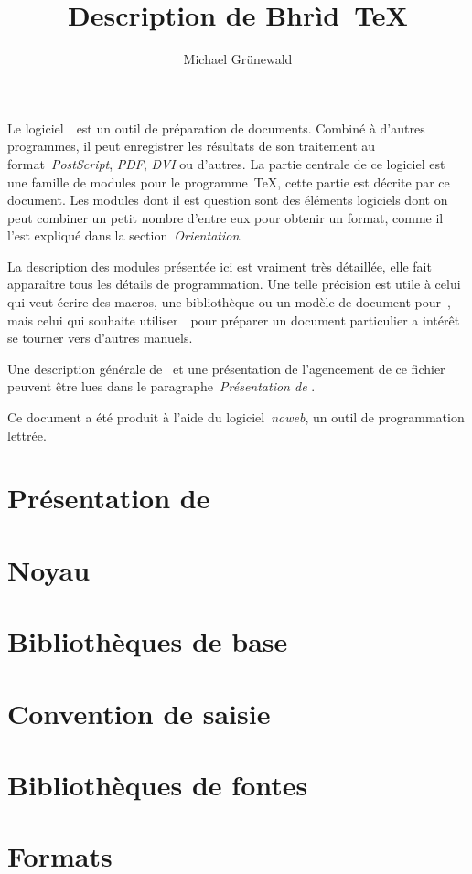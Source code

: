 \documentclass{article}
\title{Description de Bhrìd~\TeX}
\author{Michael Grünewald}
\begin{document}
Le logiciel~\brTeX\ est un outil de préparation de documents. Combiné
à d'autres programmes, il peut enregistrer les résultats de son
traitement au format~\emph{PostScript}, \emph{PDF}, \emph{DVI} ou
d'autres. La partie centrale de ce logiciel est une famille de modules
pour le programme~\TeX, cette partie est décrite par ce document. Les
modules dont il est question sont des éléments logiciels dont on peut
combiner un petit nombre d'entre eux pour obtenir un format, comme il
l'est expliqué dans la section~\emph{Orientation}.

La description des modules présentée ici est vraiment très détaillée,
elle fait apparaître tous les détails de programmation. Une telle
précision est utile à celui qui veut écrire des macros, une
bibliothèque ou un modèle de document pour~\brTeX, mais celui qui
souhaite utiliser~\brTeX\ pour préparer un document particulier
a intérêt se tourner vers d'autres manuels.

Une description générale de \brTeX\ et une présentation de
l'agencement de ce fichier peuvent être lues dans le
paragraphe~\emph{Présentation de \brTeX}.

Ce document a été produit à l'aide du logiciel~\emph{noweb}, un outil
de programmation lettrée.

\tableofcontents
\part{Présentation de \brTeX}

\part{Noyau}


\part{Bibliothèques de base}






\part{Convention de saisie}





\part{Bibliothèques de fontes}







\part{Formats}





\end{document}
